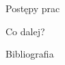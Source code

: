 \documentclass[11pt,pdftex,mathserif]{beamer}
\theoremstyle{definition}
\begin{document}
\begin{frame}{Postępy prac}

\end{frame}


\begin{frame}{Co dalej?}

\end{frame}

\begin{frame}{Bibliografia}


\end{frame}


% 
% 
% 
% 

\end{document}
